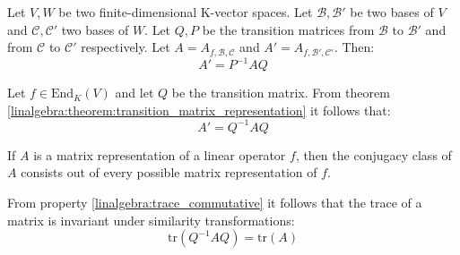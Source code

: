 	\begin{theorem}\label{linalgebra:theorem:transition_matrix_representation}
        	Let $V,W$ be two finite-dimensional K-vector spaces. Let $\mathcal{B}, \mathcal{B}'$ be two bases of $V$ and $\mathcal{C}, \mathcal{C}'$ two bases of $W$. Let $Q, P$ be the transition matrices from $\mathcal{B}$ to $\mathcal{B}'$ and from $\mathcal{C}$ to $\mathcal{C}'$ respectively. Let $A=A_{f, \mathcal{B}, \mathcal{C}}$ and $A' = A_{f, \mathcal{B}', \mathcal{C}'}$. Then:
	        \begin{equation}
        	    	A' = P^{-1}AQ
        	\end{equation}
	\end{theorem}
        \begin{result}
		Let $f\in \text{End}_K(V)$ and let $Q$ be the transition matrix. From theorem \ref{linalgebra:theorem:transition_matrix_representation} it follows that:
            	\begin{equation}
	            	A'=Q^{-1}AQ
        	\end{equation}
	\end{result}

        \begin{remark}
        	If $A$ is a matrix representation of a linear operator $f$, then the conjugacy class of $A$ consists out of every possible matrix representation of $f$.
        \end{remark}
        
        \begin{property}
        	From property \ref{linalgebra:trace_commutative} it follows that the trace of a matrix is invariant under similarity transformations:
        	\begin{equation}
            		\label{linalgebra:trace_invariance}
            		\boxed{\text{tr}(Q^{-1}AQ) = \text{tr}(A)}
	        \end{equation}
        \end{property}
        
